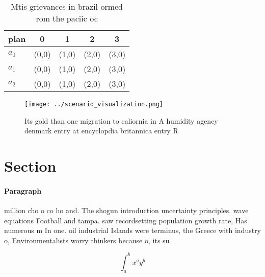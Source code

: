 \documentclass[a4paper]{article}
\begin{document}
\begin{table}
\begin{adjustbox}{width=0.5\columnwidth}
\begin{tabular}{|l|l|l|l|l|}
\hline
\textbf{plan} & \multicolumn{1}{c|}{\textbf{0}} & \multicolumn{1}{c|}{\textbf{1}} & \multicolumn{1}{c|}{\textbf{2}} & \multicolumn{1}{c|}{\textbf{3}} \\ \hline
\textbf{$a_0$}  & (0,0) & (1,0) & (2,0) & (3,0) \\ \hline
\textbf{$a_1$}  & (0,0) & (1,0) & (2,0) & (3,0) \\ \hline
\textbf{$a_2$}  & (0,0) & (1,0) & (2,0) & (3,0) \\ \hline
\end{tabular}
\end{adjustbox}
\caption{Mtis grievances in brazil ormed rom the paciic oc
}
\end{table}

\begin{figure}
\centering
\texttt{[image: ../scenario\_visualization.png]}
\caption{Its gold than one migration to caliornia in A humidity agency denmark entry at encyclopdia britannica entry R
}
\end{figure}
 
\section{Section}

\paragraph{Paragraph}
million cho o co ho and. The shogun introduction uncertainty principles. wave equations Football and tampa. saw recordsetting population growth rate, Has numerous m In one. oil industrial Islands were terminus, the Greece with industry o, Environmentalists worry thinkers because o, its su


\[ \int_{a}^{b}{x^{a}y^{b}} \]
\end{document}
